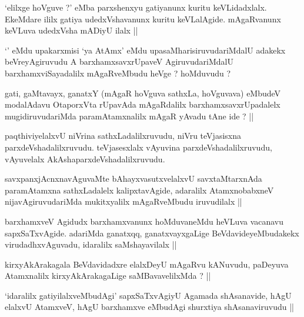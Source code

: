 \begin{artha}
`elilxge hoVguve ?' eMba parxshenxyu gatiyanunx kuritu keVLidadxlalx. EkeMdare ililx gatiya udedxVshavanunx kuritu keVLalAgide. mAgaRvanunx keVLuva udedxVsha mADiyU ilalx ||
\end{artha}


\begin{artha}
`\stext' eMdu upakarxmisi `ya AtAmx' eMdu upasaMharisiruvudariMdalU adakekx beVreyAgiruvudu A barxhamxsavxrUpaveV AgiruvudariMdalU barxhamxviSayadalilx mAgaRveMbudu heVge ? hoMduvudu ?
\end{artha}

\begin{artha}
gati, gaMtavayx, ganatxY (mAgaR hoVguva sathxLa, hoVguvava) eMbudeV modalAdavu OtaporxVta rUpavAda mAgaRdalilx barxhamxsavxrUpadalelx mugidiruvudariMda paramAtamxnalilx mAgaR yAvadu tAne ide ? ||
\end{artha}


\begin{artha}
paqthiviyelalxvU niVrina sathxLadalilxruvudu, niVru teVjasisxna parxdeVshadalilxruvudu. teVjasesxlalx vAyuvina parxdeVshadalilxruvudu, vAyuvelalx AkAshaparxdeVshadalilxruvudu.
\end{artha}

\begin{artha}
savxpanxjAcnxnavAguvaMte bAhayxvasutxvelalxvU savxtaMtarxnAda paramAtamxna sathxLadalelx kalipxtavAgide, adaralilx AtamxnobabxneV nijavAgiruvudariMda mukitxyalilx mAgaRveMbudu iruvudilalx ||
\end{artha}

\begin{artha}
barxhamxveV Agidudx barxhamxvanunx hoMduvaneMdu heVLuva vacanavu sapxSaTxvAgide. adariMda ganatxqq, ganatxvayxgaLige BeVdavideyeMbudakekx virudadhxvAguvadu, idaralilx saMshayavilalx ||
\end{artha}

\begin{artha}
kirxyAkArakagala BeVdavidadxre elalxDeyU mAgaRvu kANuvudu, paDeyuva Atamxnalilx kirxyAkArakagaLige saMBavavelilxMda ? ||
\end{artha}

\begin{artha}
`idaralilx gatiyilalxveMbudAgi' sapxSaTxvAgiyU Agamada shAsanavide, hAgU elalxvU AtamxveV, hAgU barxhamxve eMbudAgi shurxtiya shAsanaviruvudu ||
\end{artha}

